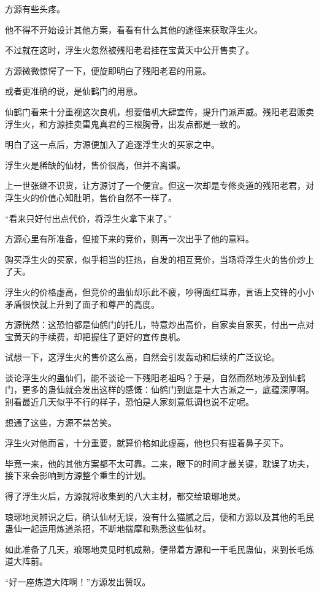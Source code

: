 \begin{this_body}
方源有些头疼。

他不得不开始设计其他方案，看看有什么其他的途径来获取浮生火。

不过就在这时，浮生火忽然被残阳老君挂在宝黄天中公开售卖了。

方源微微惊愕了一下，便旋即明白了残阳老君的用意。

或者更准确的说，是仙鹤门的用意。

仙鹤门看来十分重视这次良机，想要借机大肆宣传，提升门派声威。残阳老君贩卖浮生火，和方源挂卖雷鬼真君的三根胸骨，出发点都是一致的。

明白了这一点后，方源便加入了追逐浮生火的买家之中。

浮生火是稀缺的仙材，售价很高，但并不离谱。

上一世张继不识货，让方源讨了一个便宜。但这一次却是专修炎道的残阳老君，对浮生火的价值心知肚明，售价自然不一样了。

“看来只好付出点代价，将浮生火拿下来了。”

方源心里有所准备，但接下来的竞价，则再一次出乎了他的意料。

购买浮生火的买家，似乎相当的狂热，自发的相互竞价，当场将浮生火的售价炒上了天。

浮生火的价格虚高，但竞价的蛊仙却乐此不疲，吵得面红耳赤，言语上交锋的小小矛盾很快就上升到了面子和尊严的高度。

方源恍然：这恐怕都是仙鹤门的托儿，特意炒出高价，自家卖自家买，付出一点对宝黄天的手续费，却把握住了更好的宣传良机。

试想一下，这浮生火的售价这么高，自然会引发轰动和后续的广泛议论。

谈论浮生火的蛊仙们，能不谈论一下残阳老祖吗？于是，自然而然地涉及到仙鹤门，更多的蛊仙就会发出这样的感慨：仙鹤门到底是十大古派之一，底蕴深厚啊。别看最近几天似乎不行的样子，恐怕是人家刻意低调也说不定呢。

想通了这些，方源不禁苦笑。

浮生火对他而言，十分重要，就算价格如此虚高，他也只有捏着鼻子买下。

毕竟一来，他的其他方案都不太可靠。二来，眼下的时间才最关键，耽误了功夫，接下来会影响到方源整个重生的计划。

得了浮生火后，方源就将收集到的八大主材，都交给琅琊地灵。

琅琊地灵辨识之后，确认仙材无误，没有什么猫腻之后，便和方源以及其他的毛民蛊仙一起运用炼道杀招，不断地揣摩和熟悉这些仙材。

如此准备了几天，琅琊地灵见时机成熟，便带着方源和一干毛民蛊仙，来到长毛炼道大阵前。

“好一座炼道大阵啊！”方源发出赞叹。


\end{this_body}

